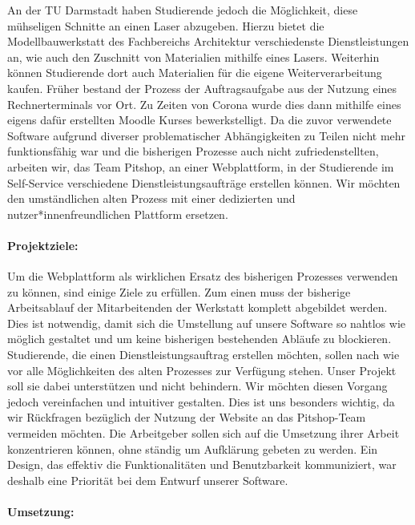 \documentclass[
ngerman,
accentcolor=2d,
marginpar=false,
class=report,
fontsize=11pt,
ruledheaders=section,
]{tudapub}
\begin{document}
	    An der TU Darmstadt haben Studierende jedoch die Möglichkeit, diese mühseligen Schnitte an einen Laser abzugeben. Hierzu bietet die Modellbauwerkstatt des Fachbereichs Architektur verschiedenste Dienstleistungen an, wie auch den Zuschnitt von Materialien mithilfe eines Lasers. Weiterhin können Studierende dort auch Materialien für die eigene Weiterverarbeitung kaufen. Früher bestand der Prozess der Auftragsaufgabe aus der Nutzung eines Rechnerterminals vor Ort. Zu Zeiten von Corona wurde dies dann mithilfe eines eigens dafür erstellten Moodle Kurses bewerkstelligt. Da die zuvor verwendete Software aufgrund diverser problematischer Abhängigkeiten zu Teilen nicht mehr funktionsfähig war und die bisherigen Prozesse auch nicht zufriedenstellten, arbeiten wir, das Team Pitshop, an einer Webplattform, in der Studierende im Self-Service verschiedene Dienstleistungsaufträge erstellen können. Wir möchten den umständlichen alten Prozess mit einer dedizierten
	    und nutzer*innenfreundlichen Plattform ersetzen.

	    \paragraph{Projektziele:}

	    Um die Webplattform als wirklichen Ersatz des bisherigen Prozesses verwenden zu können, sind einige Ziele zu erfüllen. Zum einen muss der bisherige Arbeitsablauf der Mitarbeitenden der Werkstatt komplett abgebildet werden. Dies ist notwendig, damit sich die Umstellung auf unsere Software so nahtlos wie möglich gestaltet und um keine bisherigen bestehenden Abläufe
	    zu blockieren. Studierende, die einen Dienstleistungsauftrag erstellen möchten, sollen nach wie vor alle Möglichkeiten des alten Prozesses zur Verfügung stehen. Unser Projekt soll sie dabei unterstützen und nicht behindern. Wir möchten diesen Vorgang jedoch vereinfachen und intuitiver gestalten. Dies ist uns besonders wichtig, da wir Rückfragen bezüglich der Nutzung der Website an das Pitshop-Team vermeiden möchten. Die Arbeitgeber sollen sich auf die Umsetzung ihrer Arbeit konzentrieren können, ohne ständig um Aufklärung gebeten zu werden. Ein Design, das effektiv die Funktionalitäten und Benutzbarkeit kommuniziert, war deshalb eine Priorität bei dem Entwurf unserer Software.

	    \paragraph{Umsetzung:}
\end{document}
